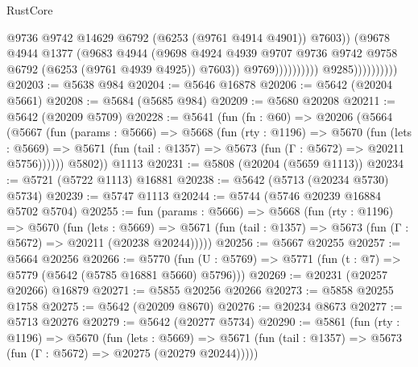 \begin{lexlean}{RustCore}
\begin{coremodule}
                                              @9736
                                              @9742
                                              @14629
                                              @6792
                                              (@6253 (@9761 @4914 @4901))
                                              @7603))
                                          (@9678
                                            @4944
                                            @1377
                                            (@9683
                                              @4944
                                              (@9698
                                                @4924
                                                @4939
                                                @9707
                                                @9736
                                                @9742
                                                @9758
                                                @6792
                                                (@6253 (@9761 @4939 @4925))
                                                @7603))
                                            @9769))))))))))
                        @9285))))))))))
@20203 := @5638 @984
@20204 := @5646 @16878
@20206 := @5642 (@20204 @5661)
@20208 := @5684 (@5685 @984)
@20209 := @5680 @20208
@20211 := @5642 (@20209 @5709)
@20228 := @5641
    (fun (fn : @60) =>
    @20206
      (@5664
        (@5667
          (fun (params : @5666) =>
          @5668
            (fun (rty : @1196) =>
            @5670
              (fun (lets : @5669) =>
              @5671 (fun (tail : @1357) => @5673 (fun (Γ : @5672) => @20211 @5756))))))
        @5802))
    @1113
@20231 := @5808 (@20204 (@5659 @1113))
@20234 := @5721 (@5722 @1113) @16881
@20238 := @5642 (@5713 (@20234 @5730) @5734)
@20239 := @5747 @1113
@20244 := @5744 (@5746 @20239 @16884 @5702 @5704)
@20255 := fun (params : @5666) =>
  @5668
    (fun (rty : @1196) =>
    @5670
      (fun (lets : @5669) =>
      @5671 (fun (tail : @1357) => @5673 (fun (Γ : @5672) => @20211 (@20238 @20244)))))
@20256 := @5667 @20255
@20257 := @5664 @20256
@20266 := @5770
    (fun (U : @5769) => @5771 (fun (t : @7) => @5779 (@5642 (@5785 @16881 @5660) @5796)))
@20269 := @20231 (@20257 @20266) @16879
@20271 := @5855 @20256 @20266
@20273 := @5858 @20255 @1758
@20275 := @5642 (@20209 @8670)
@20276 := @20234 @8673
@20277 := @5713 @20276
@20279 := @5642 (@20277 @5734)
@20290 := @5861
    (fun (rty : @1196) =>
    @5670
      (fun (lets : @5669) =>
      @5671 (fun (tail : @1357) => @5673 (fun (Γ : @5672) => @20275 (@20279 @20244)))))

\end{coremodule}
\end{lexlean}
